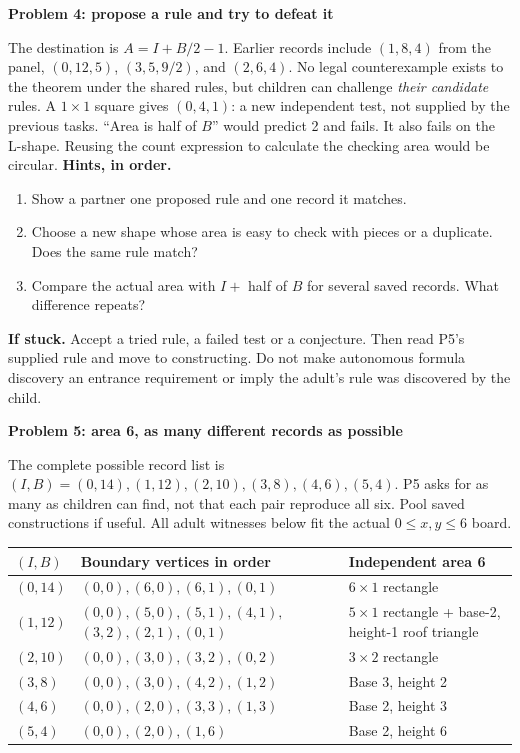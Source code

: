 \documentclass[letterpaper,11pt]{article}
\newcommand{\heading}[1]{\vspace{3pt}{\large\bfseries #1}\par}
\newcommand{\subhead}[1]{\vspace{2pt}\textbf{#1}\par}
\newcommand{\hints}[3]{\textbf{Hints, in order.}\begin{enumerate}\item #1\item #2\item #3\end{enumerate}}
\begin{document}
\heading{Problems 4--5 / student pp.\,4--5 / conjecture and inverse work}
\subhead{Problem 4: propose a rule and try to defeat it}
The destination is $A=I+B/2-1$. Earlier records include $(1,8,4)$ from the panel, $(0,12,5)$, $(3,5,9/2)$, and $(2,6,4)$. No legal counterexample exists to the theorem under the shared rules, but children can challenge \emph{their candidate} rules. A $1\times1$ square gives $(0,4,1)$: a new independent test, not supplied by the previous tasks. ``Area is half of $B$'' would predict 2 and fails. It also fails on the L-shape. Reusing the count expression to calculate the checking area would be circular.
\hints{Show a partner one proposed rule and one record it matches.}{Choose a new shape whose area is easy to check with pieces or a duplicate. Does the same rule match?}{Compare the actual area with $I+$ half of $B$ for several saved records. What difference repeats?}
\textbf{If stuck.} Accept a tried rule, a failed test or a conjecture. Then read P5's supplied rule and move to constructing. Do not make autonomous formula discovery an entrance requirement or imply the adult's rule was discovered by the child.

\subhead{Problem 5: area 6, as many different records as possible}
The complete possible record list is \textbf{$(I,B)=(0,14),\allowbreak(1,12),\allowbreak(2,10),\allowbreak(3,8),\allowbreak(4,6),\allowbreak(5,4)$}. P5 asks for as many as children can find, not that each pair reproduce all six. Pool saved constructions if useful. All adult witnesses below fit the actual $0\leq x,y\leq6$ board.

\begin{tabularx}{\linewidth}{@{}L{.63in}X L{1.48in}@{}}\toprule
$(I,B)$ & Boundary vertices in order & Independent area 6\\\midrule
$(0,14)$ & $(0,0),\allowbreak(6,0),\allowbreak(6,1),\allowbreak(0,1)$ & $6\times1$ rectangle\\
$(1,12)$ & $(0,0),\allowbreak(5,0),\allowbreak(5,1),\allowbreak(4,1),$\newline $(3,2),\allowbreak(2,1),\allowbreak(0,1)$ & $5\times1$ rectangle + base-2, height-1 roof triangle\\
$(2,10)$ & $(0,0),\allowbreak(3,0),\allowbreak(3,2),\allowbreak(0,2)$ & $3\times2$ rectangle\\
$(3,8)$ & $(0,0),\allowbreak(3,0),\allowbreak(4,2),\allowbreak(1,2)$ & Base 3, height 2\\
$(4,6)$ & $(0,0),\allowbreak(2,0),\allowbreak(3,3),\allowbreak(1,3)$ & Base 2, height 3\\
$(5,4)$ & $(0,0),\allowbreak(2,0),\allowbreak(1,6)$ & Base 2, height 6\\\bottomrule
\end{tabularx}
\end{document}
